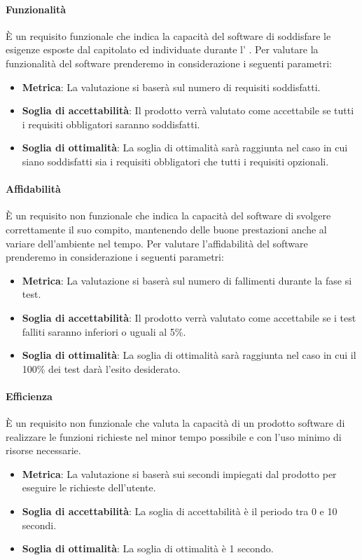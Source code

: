 \paragraph{Funzionalità}
È un requisito funzionale che indica la capacità del software di soddisfare le esigenze esposte dal capitolato ed individuate durante l’ \AdR .
Per valutare la funzionalità del software prenderemo in considerazione i seguenti parametri:
\begin{itemize}
	\item \textbf{Metrica}: La valutazione si baserà sul numero di requisiti soddisfatti.
	\item \textbf{Soglia di accettabilità}: Il prodotto verrà valutato come accettabile se tutti i requisiti obbligatori saranno soddisfatti.
	\item \textbf{Soglia di ottimalità}: La soglia di ottimalità sarà raggiunta nel caso in cui siano soddisfatti sia i requisiti obbligatori che tutti i requisiti opzionali.
\end{itemize}

\paragraph{Affidabilità}
È un requisito non funzionale che indica la capacità del software di svolgere correttamente il suo compito, mantenendo delle buone prestazioni anche al variare dell’ambiente nel tempo.
Per valutare l'affidabilità del software prenderemo in considerazione i seguenti parametri:
\begin{itemize}
	\item \textbf{Metrica}: La valutazione si baserà sul numero di fallimenti durante la fase si test.
	\item \textbf{Soglia di accettabilità}: Il prodotto verrà valutato come accettabile se i test falliti saranno inferiori o uguali al 5\%.
	\item \textbf{Soglia di ottimalità}: La soglia di ottimalità sarà raggiunta nel caso in cui il 100\% dei test darà l'esito desiderato.
\end{itemize}

\paragraph{Efficienza \color{red}{Oltre al tempo anche costo di ether???}}
È un requisito non funzionale che valuta la capacità di un prodotto software di realizzare le funzioni richieste nel minor tempo possibile e con l’uso minimo di risorse necessarie.
\begin{itemize}
	\item \textbf{Metrica}: La valutazione si baserà sui secondi impiegati dal prodotto per eseguire le richieste dell'utente.
	\item \textbf{Soglia di accettabilità}: La soglia di accettabilità è il periodo tra 0 e 10 secondi.
	\item \textbf{Soglia di ottimalità}: La soglia di ottimalità è 1 secondo.
\end{itemize}

